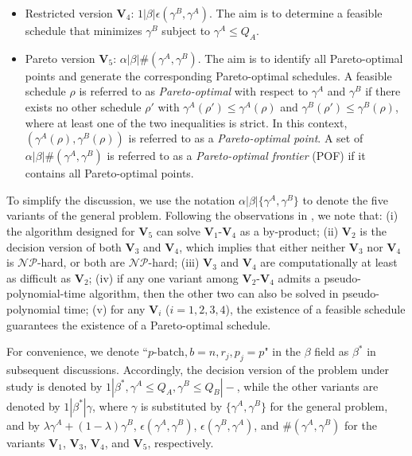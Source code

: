 \documentclass[12pt]{article}
\begin{document}
\begin{sloppypar}
\begin{itemize}
\item Restricted version $\mathbf{V}_4$: $1| \beta | \epsilon(\gamma^B, \gamma^A)$. The aim is to determine a feasible schedule that minimizes $\gamma^B$ subject to $\gamma^A \leq Q_A$. 

\item Pareto version $\mathbf{V}_5$: $\alpha | \beta | \#(\gamma^A, \gamma^B)$. The aim is to identify all Pareto-optimal points and generate the corresponding Pareto-optimal schedules. 
A feasible schedule $\rho$ is referred to as \emph{Pareto-optimal}
with respect to $\gamma^A$ and $\gamma^B$ if there exists no other schedule $\rho'$ with $\gamma^A(\rho') \leq \gamma^A(\rho)$ and $\gamma^B(\rho') \leq \gamma^B(\rho)$, where at least one of the two inequalities is strict. In this context, $(\gamma^A(\rho), \gamma^B(\rho))$ is referred to as a \emph{Pareto-optimal point}. A set of $\alpha | \beta | \#(\gamma^A, \gamma^B)$ is referred to as a \emph{Pareto-optimal frontier} (POF) if it contains all Pareto-optimal points.
\end{itemize}

To simplify the discussion, we use the notation $\alpha | \beta| \{\gamma^A, \gamma^B\}$ to denote the five variants of the general problem. Following the observations in \cite{TkindtBillaut2006book}, we note that: (i) the algorithm designed for $\mathbf{V}_5$ can solve $\mathbf{V}_1 \text{-} \mathbf{V}_4$ as a by-product; (ii) $\mathbf{V}_2$ is the decision version of both $\mathbf{V}_3$ and $\mathbf{V}_4$, which implies that either neither $\mathbf{V}_3$ nor $\mathbf{V}_4$ is $\mathcal{NP}$-hard, or both are $\mathcal{NP}$-hard; (iii) $\mathbf{V}_3$ and $\mathbf{V}_4$ are computationally at least as difficult as $\mathbf{V}_2$; (iv) if any one variant among $\mathbf{V}_2 \text{-} \mathbf{V}_4$ admits a pseudo-polynomial-time algorithm, then the other two can also be solved in pseudo-polynomial time; (v) for any $\mathbf{V}_i$ ($i=1, 2, 3, 4$), the existence of a feasible schedule guarantees the existence of a Pareto-optimal schedule.

For convenience, we denote ``$p\text{-batch}, b = n, r_j, p_j=p$" in the $\beta$ field as $\beta^{*}$  in subsequent discussions. Accordingly, the decision version of the problem under study is denoted by $1 | \beta^{*}, \gamma^A \leq Q_A, \gamma^B \leq Q_B |-$, while the other variants are denoted by $1 | \beta^{*} | \gamma$, where $\gamma$ is substituted by $\{\gamma^A, \gamma^B\}$ for the general problem, and by $\lambda \gamma^A+(1-\lambda)\gamma^B$, $\epsilon(\gamma^A, \gamma^B)$, $\epsilon(\gamma^B, \gamma^A)$, and $\#(\gamma^A, \gamma^B)$ for the variants $\mathbf{V}_1$, $\mathbf{V}_3$, $\mathbf{V}_4$, and $\mathbf{V}_5$, respectively.


\end{sloppypar}
\end{document}
